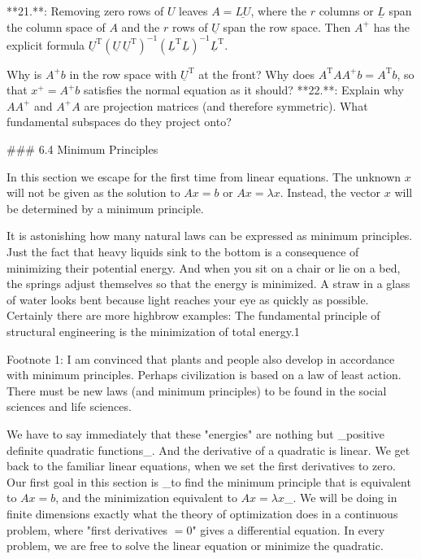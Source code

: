 

**21.**: Removing zero rows of \(U\) leaves \(A=\underline{LU}\), where the \(r\) columns or \(\underline{L}\) span the column space of \(A\) and the \(r\) rows of \(\underline{U}\) span the row space. Then \(A^{+}\) has the explicit formula \(\underline{U}^{\mathrm{T}}(\underline{U}\ \underline{U}^{\mathrm{T}})^{-1}( \underline{L}^{\mathrm{T}}\underline{L})^{-1}\underline{L}^{\mathrm{T}}\).

Why is \(A^{+}b\) in the row space with \(\underline{U}^{\mathrm{T}}\) at the front? Why does \(A^{\mathrm{T}}AA^{+}b=A^{\mathrm{T}}b\), so that \(x^{+}=A^{+}b\) satisfies the normal equation as it should?
**22.**: Explain why \(AA^{+}\) and \(A^{+}A\) are projection matrices (and therefore symmetric). What fundamental subspaces do they project onto?

### 6.4 Minimum Principles

In this section we escape for the first time from linear equations. The unknown \(x\) will not be given as the solution to \(Ax=b\) or \(Ax=\lambda x\). Instead, the vector \(x\) will be determined by a minimum principle.

It is astonishing how many natural laws can be expressed as minimum principles. Just the fact that heavy liquids sink to the bottom is a consequence of minimizing their potential energy. And when you sit on a chair or lie on a bed, the springs adjust themselves so that the energy is minimized. A straw in a glass of water looks bent because light reaches your eye as quickly as possible. Certainly there are more highbrow examples: The fundamental principle of structural engineering is the minimization of total energy.1

Footnote 1: I am convinced that plants and people also develop in accordance with minimum principles. Perhaps civilization is based on a law of least action. There must be new laws (and minimum principles) to be found in the social sciences and life sciences.

We have to say immediately that these "energies" are nothing but _positive definite quadratic functions_. And the derivative of a quadratic is linear. We get back to the familiar linear equations, when we set the first derivatives to zero. Our first goal in this section is _to find the minimum principle that is equivalent to \(Ax=b\), and the minimization equivalent to \(Ax=\lambda x\)_. We will be doing in finite dimensions exactly what the theory of optimization does in a continuous problem, where "first derivatives \(=0\)" gives a differential equation. In every problem, we are free to solve the linear equation or minimize the quadratic.

